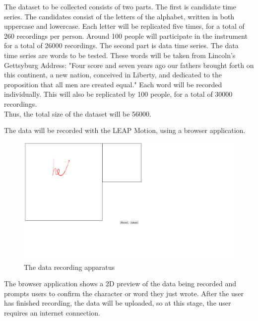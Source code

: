The dataset to be collected consists of two parts.
The first is candidate time series. The candidates consist of the letters of the alphabet, written in both uppercase and lowercase. Each letter will be replicated five times, for a total of 260 recordings per person. Around 100 people will participate in the instrument for a total of 26000 recordings.
The second part is data time series. The data time series are words to be tested. These words will be taken from Lincoln's Gettsyburg Address: "Four score and seven years ago our fathers brought forth on this continent, a new nation, conceived in Liberty, and dedicated to the proposition that all men are created equal." Each word will be recorded individually. This will also be replicated by 100 people, for a total of 30000 recordings.
\\[1\baselineskip]
Thus, the total size of the dataset will be 56000.

The data will be recorded with the LEAP Motion, using a browser application. \\
\begin{figure}
  \begin{center}
  \includegraphics[width=\columnwidth]{images/recording-1.PNG}
  \caption{The data recording apparatus}
  \label{fig:teaser}
  \end{center}  
\end{figure}
The browser application shows a 2D preview of the data being recorded and prompts users to confirm the character or word they just wrote.
After the user has finished recording, the data will be uploaded, so at this stage, the user requires an internet connection.
